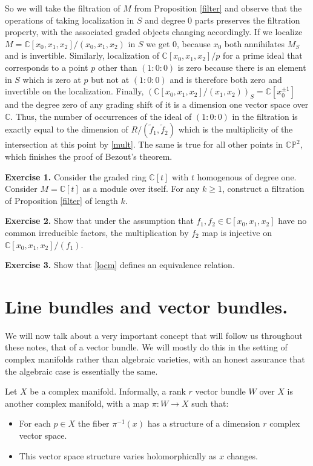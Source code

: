 \documentclass[11pt]{article}
\numberwithin{equation}{section}
\numberwithin{footnote}{section}
\renewcommand{\P}{{\mathbb P}}
\newcommand{\C}{{\mathbb C}}
\begin{document}
\smallskip
So we will take the filtration of $M$ from Proposition \ref{filter} and observe that the operations of taking localization in $S$ and degree $0$ parts preserves the filtration property, with the associated graded objects changing accordingly. If we localize 
$M = \C[x_0,x_1,x_2]/(x_0,x_1,x_2)$
in $S$ we get $0$, because $x_0$  both annihilates $M_S$ and is invertible. Similarly, localization of $\C[x_0,x_1,x_2]/p$ for a prime ideal that corresponds to a point $p$ other than $(1:0:0)$ is zero because there is an element in $S$ which is zero at $p$ but not at $(1:0:0)$ and is therefore both zero and invertible on the localization. Finally, $(\C[x_0,x_1,x_2]/(x_1,x_2))_S = \C[x_0^{\pm 1}]$ and the degree zero of any grading shift of it is a dimension one vector space over $\C$. Thus, the number of occurrences of the ideal of $(1:0:0)$ in the filtration is exactly equal to the dimension of $R/(\tilde f_1,\tilde f_2)$ which is the multiplicity of the intersection at this point by \eqref{mult}. The same is true for all other points in $\C\P^2$, which finishes the proof of Bezout's theorem.


{\bf Exercise 1.} Consider the graded ring $\C[t]$ with $t$ homogenous of degree one. Consider $M=\C[t]$ as a module over itself. For any $k\geq 1$, construct a filtration of Proposition \ref{filter} of length $k$. 

{\bf Exercise 2.} Show that under the assumption that $f_1,f_2\in \C[x_0,x_1,x_2]$ have no common irreducible factors, the multiplication by $f_2$ map is injective on $\C[x_0,x_1,x_2]/(f_1)$.

{\bf Exercise 3.} Show that \eqref{locm} defines an equivalence relation.



\section{Line bundles and vector bundles.}\label{sec.vb}
We will now talk about a very important concept that will follow us throughout these notes, that of a vector bundle. We will mostly do this in the setting of complex manifolds rather than algebraic varieties, with an honest assurance that the algebraic case is essentially the same.

\smallskip
Let $X$ be a complex manifold. Informally, a rank $r$ vector bundle $W$ over $X$ is another complex manifold, with a map $\pi:W\to X$ such that:
\begin{itemize}
\item 
For each $p\in X$ the fiber $\pi^{-1}(x)$ has a structure of a dimension $r$ complex vector space.
\item
This vector space structure varies holomorphically as $x$ changes.
\end{itemize}
\end{document}
